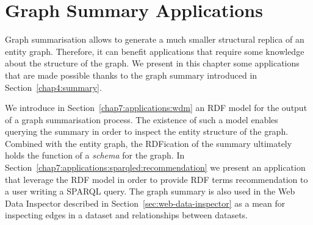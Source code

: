 \chapter{Graph Summary Applications}
\label{chap7:applications}

Graph summarisation allows to generate a much smaller structural replica of an entity graph. Therefore, it can benefit applications that require some knowledge about the structure of the graph. We present in this chapter some applications that are made possible thanks to the graph summary introduced in Section~\ref{chap4:summary}.

We introduce in Section~\ref{chap7:applications:wdm} an RDF model for the output of a graph summarisation process. The existence of such a model enables querying the summary in order to inspect the entity structure of the graph. Combined with the entity graph, the RDFication of the summary ultimately holds the function of a \emph{schema} for the graph. In Section~\ref{chap7:applications:sparqled:recommendation} we present an application that leverage the RDF model in order to provide RDF terms recommendation to a user writing a SPARQL query. The graph summary is also used in the Web Data Inspector described in Section~\ref{sec:web-data-inspector} as a mean for inspecting edges in a dataset and relationships between datasets.
